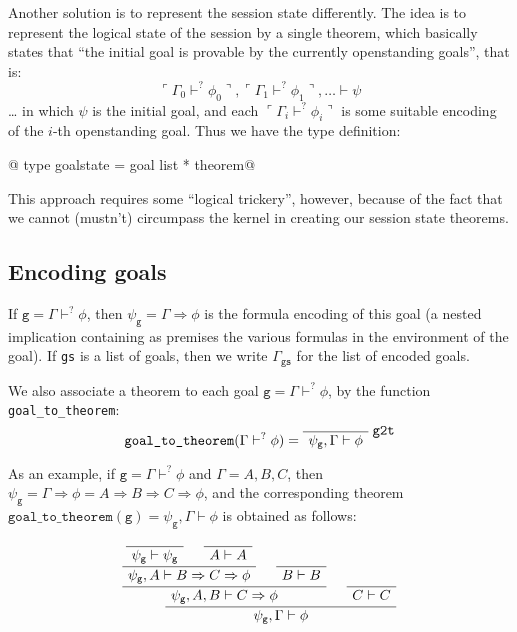 \documentclass[a4paper,11pt]{article} %
\begin{document}
Another solution is to represent the session state differently. The idea is to represent the logical state of the session by a single theorem, which basically states that “the initial goal is provable by the currently openstanding goals”, that is:
\begin{equation*}
\ulcorner \Gamma_0 \vdash^? \phi_0 \urcorner, \ulcorner \Gamma_1 \vdash^? \phi_1 \urcorner, … \vdash \psi
\end{equation*}
… in which $\psi$ is the initial goal, and each $\ulcorner \Gamma_i \vdash^? \phi_i \urcorner$ is some suitable encoding of the $i$-th openstanding goal. Thus we have the type definition:

@  type goalstate = goal list * theorem@

This approach requires some “logical trickery”, however, because of the fact that we cannot (mustn't) circumpass the kernel in creating our session state theorems.

\subsection{Encoding goals}

If $\texttt{g} = \Gamma \vdash^? \phi$, then $\psi_\texttt{g} = \Gamma \Rightarrow \phi$ is the formula encoding of this goal (a nested implication containing as premises the various formulas in the environment of the goal). If \texttt{gs} is a list of goals, then we write $\Gamma_\texttt{gs}$ for the list of encoded goals.

We also associate a theorem to each goal $\texttt{g} = \Gamma \vdash^? \phi$, by the function \texttt{goal\_to\_theorem}:
\begin{equation*}
\texttt{goal\_to\_theorem}(\Gamma \vdash^? \phi) =
  \AxiomC{}
  \RightLabel{\texttt{g2t}}
  \UnaryInfC{$\psi_\texttt{g}, \Gamma \vdash \phi$}
  \bottomAlignProof
  \DisplayProof
\end{equation*}

As an example, if $\texttt{g} = \Gamma \vdash^? \phi$ and $\Gamma = A,B,C$, then $\psi_\texttt{g} = \Gamma \Rightarrow \phi = A \Rightarrow B \Rightarrow C \Rightarrow \phi$, and the corresponding theorem $\texttt{goal\_to\_theorem}(\texttt{g}) = \psi_\texttt{g}, \Gamma \vdash \phi$ is obtained as follows:

\begin{equation*}
\AxiomC{}
\UnaryInfC{$\psi_\texttt{g} \vdash \psi_\texttt{g}$}
\AxiomC{}
\UnaryInfC{$A \vdash A$}
\BinaryInfC{$\psi_\texttt{g}, A \vdash B \Rightarrow C \Rightarrow \phi$}
\AxiomC{}
\UnaryInfC{$B \vdash B$}
\BinaryInfC{$\psi_\texttt{g}, A, B \vdash C \Rightarrow \phi$}
\AxiomC{}
\UnaryInfC{$C \vdash C$}
\BinaryInfC{$\psi_\texttt{g}, \Gamma \vdash \phi$}
\DisplayProof
\end{equation*}
\end{document}
